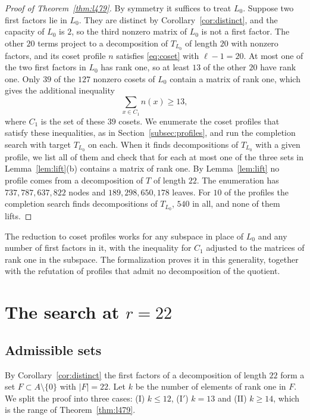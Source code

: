 \documentclass[11pt]{amsart}
\theoremstyle{definition}
\theoremstyle{remark}
\numberwithin{equation}{section}
\begin{document}
\begin{proof}[Proof of Theorem~\ref{thm:l479}]
By symmetry it suffices to treat $L_0$. Suppose two first factors lie in $L_0$. They are distinct by Corollary~\ref{cor:distinct}, and the capacity of $L_0$ is $2$, so the third nonzero matrix of $L_0$ is not a first factor. The other $20$ terms project to a decomposition of $T_{L_0}$ of length $20$ with nonzero factors, and its coset profile $n$ satisfies \eqref{eq:coset} with $\ell-1=20$. At most one of the two first factors in $L_0$ has rank one, so at least $13$ of the other $20$ have rank one. Only $39$ of the $127$ nonzero cosets of $L_0$ contain a matrix of rank one, which gives the additional inequality
\[
\sum_{x\in C_1}n(x)\ge 13,
\]
where $C_1$ is the set of these $39$ cosets. We enumerate the coset profiles that satisfy these inequalities, as in Section~\ref{subsec:profiles}, and run the completion search with target $T_{L_0}$ on each. When it finds decompositions of $T_{L_0}$ with a given profile, we list all of them and check that for each at most one of the three sets in Lemma~\ref{lem:lift}(b) contains a matrix of rank one. By Lemma~\ref{lem:lift} no profile comes from a decomposition of $T$ of length $22$. The enumeration has $737{,}787{,}637{,}822$ nodes and $189{,}298{,}650{,}178$ leaves. For $10$ of the profiles the completion search finds decompositions of $T_{L_0}$, $540$ in all, and none of them lifts.
\end{proof}

The reduction to coset profiles works for any subspace in place of $L_0$ and any number of first factors in it, with the inequality for $C_1$ adjusted to the matrices of rank one in the subspace. The formalization proves it in this generality, together with the refutation of profiles that admit no decomposition of the quotient.

\section{The search at \texorpdfstring{$r=22$}{r=22}}\label{sec:search}

\subsection{Admissible sets}
By Corollary~\ref{cor:distinct} the first factors of a decomposition of length $22$ form a set $F\subset A\setminus\{0\}$ with $|F|=22$. Let $k$ be the number of elements of rank one in $F$. We split the proof into three cases: (I) $k\le 12$, (I$'$) $k=13$ and (II) $k\ge 14$, which is the range of Theorem~\ref{thm:l479}.
\end{document}
